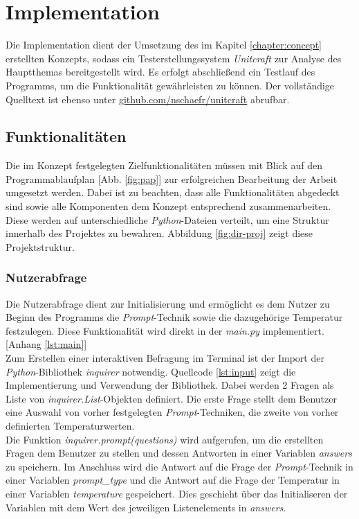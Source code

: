 \chapter{Implementation}\label{chapter:impl}
Die Implementation dient der Umsetzung des im Kapitel \ref{chapter:concept} erstellten Konzepts, sodass ein Testerstellungssystem \textit{Unitcraft} zur Analyse des Hauptthemas bereitgestellt wird. Es erfolgt abschließend ein Testlauf des Programms, um die Funktionalität gewährleisten zu können. Der vollständige Quelltext ist ebenso unter \href{https://github.com/nschaefr/unitcraft}{github.com/nschaefr/unitcraft} abrufbar.

\section{Funktionalitäten}
Die im Konzept festgelegten Zielfunktionalitäten müssen mit Blick auf den Programmablaufplan [Abb. \ref{fig:pap}] zur erfolgreichen Bearbeitung der Arbeit umgesetzt werden. Dabei ist zu beachten, dass alle Funktionalitäten abgedeckt sind sowie alle Komponenten dem Konzept entsprechend zusammenarbeiten. Diese werden auf unterschiedliche \textit{Python}-Dateien verteilt, um eine Struktur innerhalb des Projektes zu bewahren. Abbildung \ref{fig:dir-proj} zeigt diese Projektstruktur.

\subsection{Nutzerabfrage}
Die Nutzerabfrage dient zur Initialisierung und ermöglicht es dem Nutzer zu Beginn des Programms die \textit{Prompt}-Technik sowie die dazugehörige Temperatur festzulegen. Diese Funktionalität wird direkt in der \textit{main.py} implementiert. [Anhang \ref{lst:main}] \\Zum Erstellen einer interaktiven Befragung im Terminal ist der Import der \textit{Python}-Bibliothek \textit{inquirer} notwendig. Quellcode \ref{lst:input} zeigt die Implementierung und Verwendung der Bibliothek. Dabei werden 2 Fragen als Liste von \textit{inquirer.List}-Objekten definiert. Die erste Frage stellt dem Benutzer eine Auswahl von vorher festgelegten \textit{Prompt}-Techniken, die zweite von vorher definierten Temperaturwerten.\\
\vspace{-.3cm}
Die Funktion \textit{inquirer.prompt(questions)} wird aufgerufen, um die erstellten Fragen dem Benutzer zu stellen und dessen Antworten in einer Variablen \textit{answers} zu speichern. Im Anschluss wird die Antwort auf die Frage der \textit{Prompt}-Technik in einer Variablen \textit{prompt\_type} und die Antwort auf die Frage der Temperatur in einer Variablen \textit{temperature} gespeichert. Dies geschieht über das Initialiseren der Variablen mit dem Wert des jeweiligen Listenelements in \textit{answers}.

